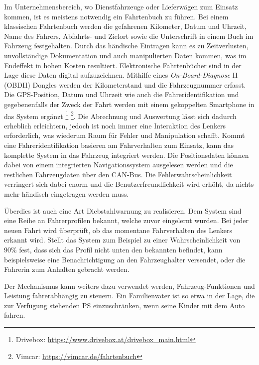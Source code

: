 Im Unternehmensbereich, wo Dienstfahrzeuge oder Lieferwägen zum Einsatz kommen, ist es meistens notwendig ein Fahrtenbuch zu führen. Bei einem klassischen Fahrtenbuch werden die gefahrenen Kilometer, Datum und Uhrzeit, Name des Fahrers, Abfahrts- und Zielort sowie die Unterschrift in einem Buch im Fahrzeug festgehalten. Durch das händische Eintragen kann es zu Zeitverlusten, unvollständige Dokumentation und auch manipulierten Daten kommen, was im Endeffekt in hohen Kosten resultiert. Elektronische Fahrtenbücher sind in der Lage diese Daten digital aufzuzeichnen. Mithilfe eines \textit{On-Board-Diagnose} II (OBDII) Dongles werden der Kilometerstand und die Fahrzeugnummer erfasst. Die GPS-Position, Datum und Uhrzeit wie auch die Fahreridentifikation und gegebenenfalls der Zweck der Fahrt werden mit einem gekoppelten Smartphone in das System ergänzt \footnote{Drivebox: \url{https://www.drivebox.at/drivebox_main.html}} \footnote{Vimcar: \url{https://vimcar.de/fahrtenbuch}}. Die Abrechnung und Auswertung lässt sich dadurch erheblich erleichtern, jedoch ist noch immer eine Interaktion des Lenkers erforderlich, was wiederum Raum für Fehler und Manipulation schafft. Kommt eine Fahreridentifikation basieren am Fahrverhalten zum Einsatz, kann das komplette System in das Fahrzeug integriert werden. Die Positionsdaten können dabei von einem integrierten Navigationssystem ausgelesen werden und die restlichen Fahrzeugdaten über den CAN-Bus. Die Fehlerwahrscheinlichkeit verringert sich dabei enorm und die Benutzerfreundlichkeit wird erhöht, da nichts mehr händisch eingetragen werden muss.

Überdies ist auch eine Art Diebstahlwarnung zu realisieren. Dem System sind eine Reihe an Fahrerprofilen bekannt, welche zuvor eingelernt wurden. Bei jeder neuen Fahrt wird überprüft, ob das momentane Fahrverhalten des Lenkers erkannt wird. Stellt das System zum Beispiel zu einer Wahrscheinlichkeit von 90\% fest, dass sich das Profil nicht unten den bekannten befindet, kann beispielsweise eine Benachrichtigung an den Fahrzeughalter versendet, oder die Fahrerin zum Anhalten gebracht werden.

Der Mechanismus kann weiters dazu verwendet werden, Fahrzeug-Funktionen und Leistung fahrerabhängig zu steuern. Ein Familienvater ist so etwa in der Lage, die zur Verfügung stehenden PS einzuschränken, wenn seine Kinder mit dem Auto fahren.

